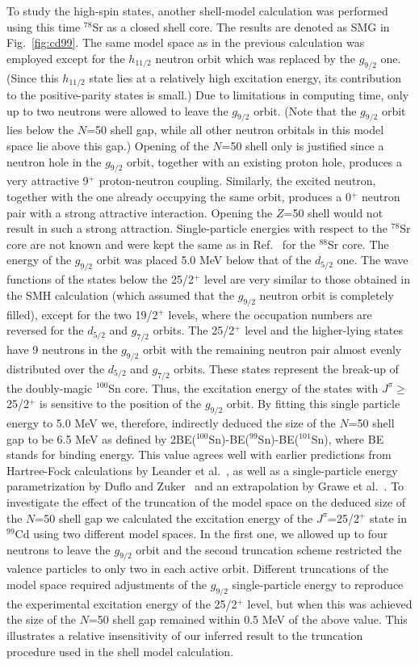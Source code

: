 \documentclass{article}
\begin{document}
To study the high-spin states, another shell-model calculation was performed
using this time $^{78}$Sr as a closed shell core. 
The results are denoted as SMG in Fig.~\ref{fig:cd99}.
The same model space as in the previous calculation was employed except for 
the $h_{11/2}$ neutron orbit which was replaced by the $g_{9/2}$ one. 
(Since this $h_{11/2}$ state lies at a relatively high excitation energy, 
its contribution to the positive-parity states is small.)
Due to limitations in computing time, only up to two neutrons were allowed to 
leave the $g_{9/2}$ orbit. (Note that the $g_{9/2}$ orbit lies below the $N$=50
shell gap, while all other neutron orbitals in this model space lie above 
this gap.) Opening of the $N$=50 shell only is justified 
since a neutron hole in the 
$g_{9/2}$ orbit, together with an existing proton hole, produces a very 
attractive 
9$^+$ proton-neutron coupling. Similarly, the excited neutron, together with 
the one already occupying the same orbit, 
produces a 0$^+$ neutron pair with a strong 
attractive interaction. Opening the $Z$=50 shell would not result in such
a strong attraction.
Single-particle energies with respect to the $^{78}$Sr core are not known and 
were 
kept the same as in Ref.~\cite{anne} for the $^{88}$Sr core. The energy of the 
$g_{9/2}$ orbit was placed 5.0 MeV below that of the $d_{5/2}$ one. 
The wave functions of the states below the 25/2$^+$ level are very 
similar to those obtained in the SMH calculation
(which assumed that the $g_{9/2}$ neutron orbit is completely filled),
except for the two 19/2$^+$ levels, where the occupation numbers are
reversed for the $d_{5/2}$ and $g_{7/2}$ orbits.  
The 25/2$^+$ level and the higher-lying states have 9 neutrons in the $g_{9/2}$ 
orbit with the remaining neutron pair almost evenly distributed over the 
$d_{5/2}$ and $g_{7/2}$ orbits.  These states represent the break-up 
of the doubly-magic $^{100}$Sn core.
Thus, the excitation 
energy of the states with $J^\pi$$\geq$25/2$^+$ is sensitive to the 
position of the $g_{9/2}$ orbit. By fitting this single particle energy 
to 5.0 MeV we, 
therefore, indirectly deduced the size of the $N$=50 shell gap to be 6.5 MeV
as defined by 2BE($^{100}$Sn)-BE($^{99}$Sn)-BE($^{101}$Sn), where BE stands
for binding energy. This value agrees well with earlier predictions from
Hartree-Fock calculations by Leander et al.~\cite{leander}, as well as
a single-particle energy parametrization by Duflo and Zuker~\cite{dz1999} 
and an extrapolation by Grawe et al.~\cite{grawe}. To investigate the
effect of the truncation of the model space on the deduced size of the
$N$=50 shell gap we calculated the excitation energy of the 
$J^\pi$=25/2$^+$ state in $^{99}$Cd using two different model spaces.
In the first one, we allowed up to four neutrons to leave the $g_{9/2}$
orbit and the second truncation scheme restricted the valence particles
to only two in each active orbit. Different truncations of the model space
required adjustments of the $g_{9/2}$ single-particle energy to reproduce
the experimental excitation energy of the 25/2$^+$ level, but when this
was achieved the size of the $N$=50 shell gap remained within 0.5 MeV of
the above value. This illustrates a relative insensitivity of our 
inferred result to the truncation procedure used in the shell model
calculation.
\end{document}
